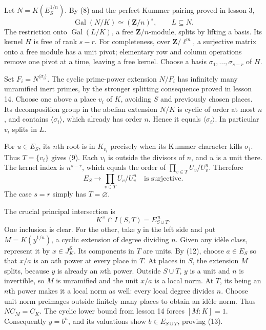 \documentclass[11pt,a4paper]{article}
\begin{document}
Let \(N=K(E_S^{1/n})\). By (8) and the perfect Kummer pairing proved in
lesson 3, \[
\operatorname{Gal}(N/K)\simeq(\mathbf Z/n)^s,\qquad L\subseteq N.
\] The restriction onto \(\operatorname{Gal}(L/K)\), a free
\(\mathbf Z/n\)-module, splits by lifting a basis. Its kernel \(H\) is
free of rank \(s-r\). For completeness, over \(\mathbf Z/\ell^m\), a
surjective matrix onto a free module has a unit pivot; elementary row
and column operations remove one pivot at a time, leaving a free kernel.
Choose a basis \(\sigma_1,\ldots,\sigma_{s-r}\) of \(H\).

Set \(F_i=N^{\langle\sigma_i\rangle}\). The cyclic prime-power extension
\(N/F_i\) has infinitely many unramified inert primes, by the stronger
splitting consequence proved in lesson 14. Choose one above a place
\(v_i\) of \(K\), avoiding \(S\) and previously chosen places. Its
decomposition group in the abelian extension \(N/K\) is cyclic of order
at most \(n\), and contains \(\langle\sigma_i\rangle\), which already
has order \(n\). Hence it equals \(\langle\sigma_i\rangle\). In
particular \(v_i\) splits in \(L\).

For \(u\in E_S\), its \(n\)th root is in \(K_{v_i}\) precisely when its
Kummer character kills \(\sigma_i\). Thus \(T=\{v_i\}\) gives (9). Each
\(v_i\) is outside the divisors of \(n\), and \(u\) is a unit there. The
kernel index is \(n^{s-r}\), which equals the order of
\(\prod_{v\in T}U_v/U_v^n\). Therefore \[
E_S\longrightarrow\prod_{v\in T}U_v/U_v^n
\quad\text{is surjective}.
\tag{12}
\] The case \(s=r\) simply has \(T=\varnothing\).

The crucial principal intersection is \[
K^\times\cap I(S,T)=E_{S\cup T}^{\,n}.
\tag{13}
\] One inclusion is clear. For the other, take \(y\) in the left side
and put \(M=K(y^{1/n})\), a cyclic extension of degree dividing \(n\).
Given any idèle class, represent it by \(x\in J_K^S\). Its components in
\(T\) are units. By (12), choose \(a\in E_S\) so that \(x/a\) is an
\(n\)th power at every place in \(T\). At places in \(S\), the extension
\(M\) splits, because \(y\) is already an \(n\)th power. Outside
\(S\cup T\), \(y\) is a unit and \(n\) is invertible, so \(M\) is
unramified and the unit \(x/a\) is a local norm. At \(T\), its being an
\(n\)th power makes it a local norm as well: every local degree divides
\(n\). Choose unit norm preimages outside finitely many places to obtain
an idèle norm. Thus \(NC_M=C_K\). The cyclic lower bound from lesson 14
forces \([M:K]=1\). Consequently \(y=b^n\), and its valuations show
\(b\in E_{S\cup T}\), proving (13).
\end{document}
